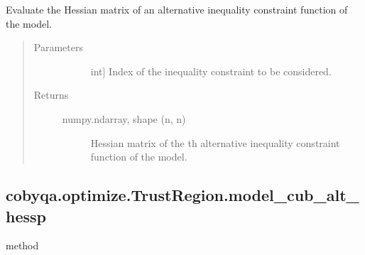 \documentclass[letterpaper,10pt,english]{sphinxmanual}
\begin{document}
\begin{fulllineitems}
\begin{fulllineitems}
\label{\detokenize{refs/generated/cobyqa.optimize.TrustRegion.model_cub_alt_hess:cobyqa.optimize.TrustRegion.model_cub_alt_hess}}
\sphinxAtStartPar
Evaluate the Hessian matrix of an alternative inequality constraint
function of the model.
\begin{quote}\begin{description}
\item[{Parameters}] \leavevmode\begin{description}
\item[{}] \leavevmode{[}int{]}
\sphinxAtStartPar
Index of the inequality constraint to be considered.

\end{description}

\item[{Returns}] \leavevmode\begin{description}
\item[{numpy.ndarray, shape (n, n)}] \leavevmode
\sphinxAtStartPar
Hessian matrix of the \sphinxhyphen{}th alternative inequality constraint
function of the model.

\end{description}

\end{description}\end{quote}

\end{fulllineitems}



\subsection{cobyqa.optimize.TrustRegion.model\_cub\_alt\_hessp}
\label{\detokenize{refs/generated/cobyqa.optimize.TrustRegion.model_cub_alt_hessp:cobyqa-optimize-trustregion-model-cub-alt-hessp}}\label{\detokenize{refs/generated/cobyqa.optimize.TrustRegion.model_cub_alt_hessp::doc}}
\sphinxAtStartPar
method


\end{fulllineitems}
\end{document}
